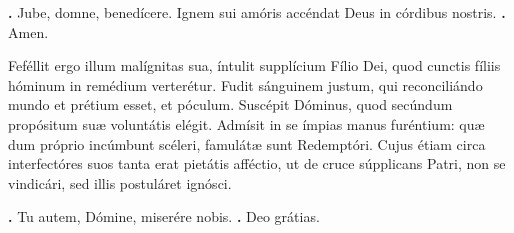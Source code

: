 \begin{small}
\textbf{\Vbar.} Jube, domne, benedícere.
  \hspace{.3em}
Ignem sui amóris accéndat Deus in córdibus nostris. \textbf{\Rbar.} Amen.
\end{small}


Feféllit ergo illum malígnitas sua, íntulit supplícium Fílio Dei, quod cunctis fíliis hóminum in remédium verterétur. Fudit sánguinem justum, qui reconciliándo mundo et prétium esset, et póculum. Suscépit Dóminus, quod secúndum propósitum suæ voluntátis elégit. Admísit in se ímpias manus furéntium: quæ dum próprio incúmbunt scéleri, famulátæ sunt Redemptóri. Cujus étiam circa interfectóres suos tanta erat pietátis afféctio, ut de cruce súpplicans Patri, non se vindicári, sed illis postuláret ignósci.

\textbf{\Vbar.} Tu autem, Dómine, miserére nobis.
\textbf{\Rbar.} Deo grátias.


